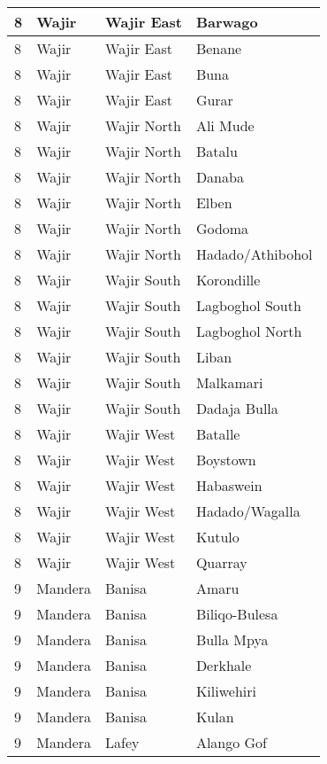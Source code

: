 \begin{table}[!ht]
\begin{tabular}{|l|l|l|l|}
        8 & Wajir & Wajir East & Barwago \\ \hline
        8 & Wajir & Wajir East & Benane \\ \hline
        8 & Wajir & Wajir East & Buna \\ \hline
        8 & Wajir & Wajir East & Gurar \\ \hline
        8 & Wajir & Wajir North & Ali Mude \\ \hline
        8 & Wajir & Wajir North & Batalu \\ \hline
        8 & Wajir & Wajir North & Danaba \\ \hline
        8 & Wajir & Wajir North & Elben \\ \hline
        8 & Wajir & Wajir North & Godoma \\ \hline
        8 & Wajir & Wajir North & Hadado/Athibohol \\ \hline
        8 & Wajir & Wajir South & Korondille \\ \hline
        8 & Wajir & Wajir South & Lagboghol South \\ \hline
        8 & Wajir & Wajir South & Lagboghol North \\ \hline
        8 & Wajir & Wajir South & Liban \\ \hline
        8 & Wajir & Wajir South & Malkamari \\ \hline
        8 & Wajir & Wajir South & Dadaja Bulla \\ \hline
        8 & Wajir & Wajir West & Batalle \\ \hline
        8 & Wajir & Wajir West & Boystown \\ \hline
        8 & Wajir & Wajir West & Habaswein \\ \hline
        8 & Wajir & Wajir West & Hadado/Wagalla \\ \hline
        8 & Wajir & Wajir West & Kutulo \\ \hline
        8 & Wajir & Wajir West & Quarray \\ \hline
        9 & Mandera & Banisa & Amaru \\ \hline
        9 & Mandera & Banisa & Biliqo-Bulesa \\ \hline
        9 & Mandera & Banisa & Bulla Mpya \\ \hline
        9 & Mandera & Banisa & Derkhale \\ \hline
        9 & Mandera & Banisa & Kiliwehiri \\ \hline
        9 & Mandera & Banisa & Kulan \\ \hline
        9 & Mandera & Lafey & Alango Gof \\ \hline

\end{tabular}
\end{table}
